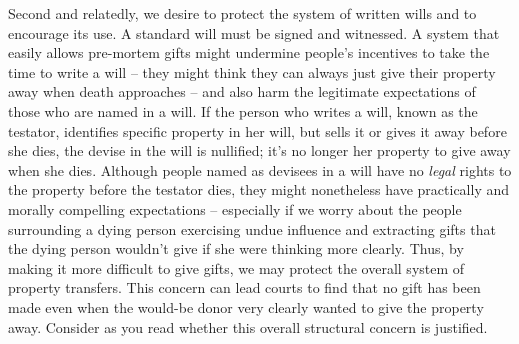 Second and relatedly, we desire to protect the system of written wills and to
encourage its use. A standard will must be signed and witnessed.  A system that
easily allows pre-mortem gifts might undermine people's incentives to take the
time to write a will -- they might think they can always just give their
property away when death approaches -- and also harm the legitimate
expectations of those who are named in a will. If the person who writes a will,
known as the testator, identifies specific property in her will, but sells it
or gives it away before she dies, the devise in the will is nullified; it's no
longer her property to give away when she dies.  Although people named as
devisees in a will have no \textit{legal }rights to the property before the
testator dies, they might nonetheless have practically and morally compelling
expectations -- especially if we worry about the people surrounding a dying
person exercising undue influence and extracting gifts that the dying person
wouldn't give if she were thinking more clearly.  Thus, by making it more
difficult to give gifts, we may protect the overall system of property
transfers. This concern can lead courts to find that no gift has been made even
when the would-be donor very clearly wanted to give the property away. 
Consider as you read whether this overall structural concern is justified.

